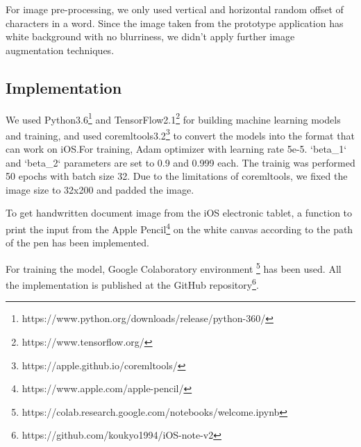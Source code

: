 For image pre-processing, we only used vertical and horizontal random offset of characters in a word.
Since the image taken from the prototype application has white background with no blurriness,
we didn't apply further image augmentation techniques.

\subsection{Implementation}

We used Python3.6\footnote{https://www.python.org/downloads/release/python-360/} and
TensorFlow2.1\footnote{https://www.tensorflow.org/} for building machine learning
models and training, and used coremltools3.2\footnote{https://apple.github.io/coremltools/}
to convert the models into the format that can work on iOS.For training,
Adam optimizer with learning rate 5e-5. `beta\_1` and `beta\_2` parameters are set to 0.9 and 0.999 each.
The trainig was performed 50 epochs with batch size 32. Due to the limitations of coremltools,
we fixed the image size to 32x200 and padded the image.

To get handwritten document image from the iOS electronic tablet, a function to print
the input from the Apple Pencil\footnote{https://www.apple.com/apple-pencil/} on the white canvas
according to the path of the pen has been implemented.

For training the model, Google Colaboratory environment
\footnote{https://colab.research.google.com/notebooks/welcome.ipynb} has been used.
All the implementation is published at the GitHub repository\footnote{https://github.com/koukyo1994/iOS-note-v2}.
